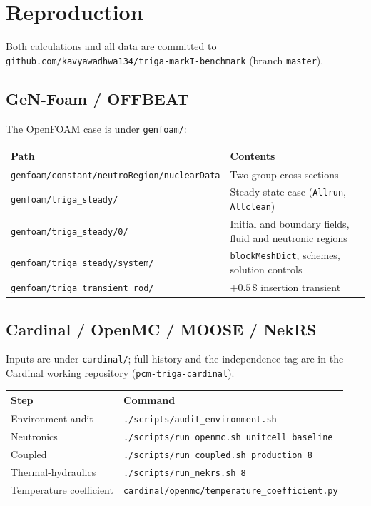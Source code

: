 \documentclass[11pt,a4paper]{article}
\begin{document}
\section{Reproduction}
Both calculations and all data are committed to
\texttt{github.com/kavyawadhwa134/triga-markI-benchmark} (branch \texttt{master}).

\subsection{GeN-Foam / OFFBEAT}
The OpenFOAM case is under \texttt{genfoam/}:

\begin{table}[H]\centering\small
\begin{tabular}{@{}ll@{}}
\toprule
\textbf{Path} & \textbf{Contents}\\
\midrule
\texttt{genfoam/constant/neutroRegion/nuclearData} & Two-group cross sections\\
\texttt{genfoam/triga\_steady/} & Steady-state case (\texttt{Allrun}, \texttt{Allclean})\\
\texttt{genfoam/triga\_steady/0/} & Initial and boundary fields, fluid and neutronic regions\\
\texttt{genfoam/triga\_steady/system/} & \texttt{blockMeshDict}, schemes, solution controls\\
\texttt{genfoam/triga\_transient\_rod/} & $+0.5\,\$$ insertion transient\\
\bottomrule
\end{tabular}
\end{table}

\subsection{Cardinal / OpenMC / MOOSE / NekRS}
Inputs are under \texttt{cardinal/}; full history and the independence tag are in
the Cardinal working repository (\texttt{pcm-triga-cardinal}).

\begin{table}[H]\centering\small
\begin{tabular}{@{}ll@{}}
\toprule
\textbf{Step} & \textbf{Command}\\
\midrule
Environment audit & \texttt{./scripts/audit\_environment.sh}\\
Neutronics & \texttt{./scripts/run\_openmc.sh unitcell baseline}\\
Coupled & \texttt{./scripts/run\_coupled.sh production 8}\\
Thermal-hydraulics & \texttt{./scripts/run\_nekrs.sh 8}\\
Temperature coefficient & \texttt{cardinal/openmc/temperature\_coefficient.py}\\
\bottomrule
\end{tabular}
\end{table}
\end{document}

